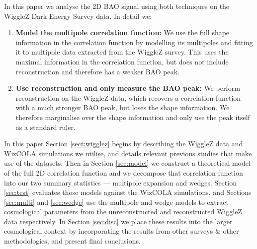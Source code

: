 \documentclass[a4paper,fleqn,usenatbib]{mnras}
\begin{document}
In this paper we analyse the 2D BAO signal using both techniques on the WiggleZ Dark Energy Survey data.  In detail we:
\begin{enumerate}
\item {\bf Model the multipole correlation function:} We use the full shape information in the correlation function by modelling its multipoles and fitting it to multipole data extracted from the WiggleZ survey.  This uses the maximal information in the correlation function, but does not include reconstruction and therefore has a weaker BAO peak. 
\item {\bf Use reconstruction and only measure the BAO peak:}  We perform reconstruction on the WiggleZ data, which recovers a correlation function with a much stronger BAO peak, but loses the shape information.  We therefore marginalise over the shape information and only use the peak itself as a standard ruler. 
\end{enumerate}

In this paper Section \ref{sect:wigglez} begins by describing the WiggleZ data and WizCOLA simulations we utilise, and details relevant previous studies that make use of the datasets.  Then in Section \ref{sec:model} we construct a theoretical model of the full 2D correlation function and we decompose that correlation function into our two summary statistics --- multipole expansion and wedges.
Section \ref{sec:test} evaluates those models against the WizCOLA simulations, and Sections \ref{sec:multi} and \ref{sec:wedge} use the multipole and wedge models to extract cosmological parameters from the unreconstructed and reconstructed WiggleZ data respectively. In Section \ref{sec:disc} we place these results into the larger cosmological context by incorporating the results from other surveys \& other methodologies, and present final conclusions.
\end{document}
